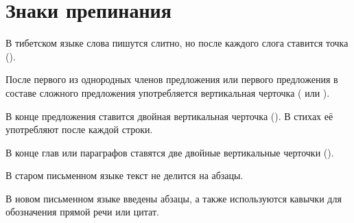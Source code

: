 \section{Знаки препинания}

В тибетском языке слова пишутся слитно, но после каждого слога ставится точка ().

После первого из однородных членов предложения или первого предложения в составе сложного предложения употребляется вертикальная черточка ( или
).

В конце предложения ставится двойная вертикальная черточка (). В стихах её употребляют после каждой строки.

В конце глав или параграфов ставятся две двойные вертикальные черточки ().

В старом письменном языке текст не делится на абзацы.

В новом письменном языке введены абзацы, а также используются кавычки для обозначения прямой речи или цитат.